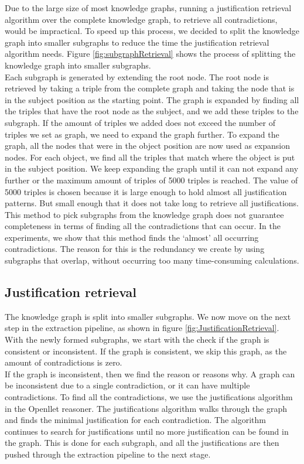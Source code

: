 \documentclass[11pt,letterpaper ,oneside ]{book}
\begin{document}
	
	Due to the large size of most knowledge graphs, running a justification retrieval algorithm over the complete knowledge graph, to retrieve all contradictions, would be impractical. To speed up this process, we decided to split the knowledge graph into smaller subgraphs to reduce the time the justification retrieval algorithm needs. Figure \ref{fig:subgraphRetrieval} shows the process of splitting the knowledge graph into smaller subgraphs.\\
	Each subgraph is generated by extending the root node. The root node is retrieved by taking a triple from the complete graph and taking the node that is in the subject position as the starting point. The graph is expanded by finding all the triples that have the root node as the subject, and we add these triples to the subgraph. If the amount of triples we added does not exceed the number of triples we set as graph, we need to expand the graph further. To expand the graph, all the nodes that were in the object position are now used as expansion nodes. For each object, we find all the triples that match where the object is put in the subject position. We keep expanding the graph until it can not expand any further or the maximum amount of triples of 5000 triples is reached. The value of 5000 triples is chosen because it is large enough to hold almost all justification patterns. But small enough that it does not take long to retrieve all justifications.\\
	This method to pick subgraphs from the knowledge graph does not guarantee completeness in terms of finding all the contradictions that can occur. In the experiments, we show that this method finds the `almost' all occurring contradictions. The reason for this is the redundancy we create by using subgraphs that overlap, without occurring too many time-consuming calculations. 
	
	\subsection{Justification retrieval}
	The knowledge graph is split into smaller subgraphs. We now move on the next step in the extraction pipeline, as shown in figure \ref{fig:JustificationRetrieval}.
	With the newly formed subgraphs, we start with the check if the graph is consistent or inconsistent. If the graph is consistent, we skip this graph, as the amount of contradictions is zero.\\ 
	If the graph is inconsistent, then we find the reason or reasons why. A graph can be inconsistent due to a single contradiction, or it can have multiple contradictions. 
	To find all the contradictions, we use the justifications algorithm in the Openllet reasoner. The justifications algorithm walks through the graph and finds the minimal justification for each contradiction. The algorithm continues to search for justifications until no more justification can be found in the graph. This is done for each subgraph, and all the justifications are then pushed through the extraction pipeline to the next stage.\\
	
\end{document}
